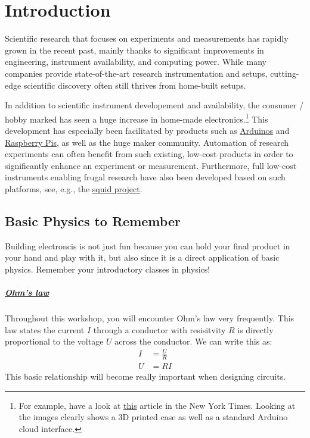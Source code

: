 
\chapter{Introduction}

Scientific research that focuses on experiments and measurements has rapidly grown in the recent past, mainly thanks to significant improvements in engineering, instrument availability, and computing power. While many companies provide state-of-the-art research instrumentation and setups, cutting-edge scientific discovery often still thrives from home-built setups. 

In addition to scientific instrument developement and availability, the consumer / hobby marked has seen a huge increase in home-made electronics.\footnote{For example, have a look at \href{https://www.nytimes.com/2021/10/10/health/coronavirus-ventilation-carbon-dioxide.html}{this} article in the New York Times. Looking at the images clearly shows a 3D printed case as well as a standard Arduino cloud interface.} This development has especially been facilitated by products such as \href{https://www.arduino.cc/}{Arduinos} and \href{https://www.raspberrypi.org/}{Raspberry Pis}, as well as the huge maker community. Automation of research experiments can often benefit from such existing, low-cost products in order to significantly enhance an experiment or measurement. Furthermore, full low-cost instruments enabling frugal research have also been developed based on such platforms, see, e.g., the \href{https://squid-imaging.org/}{\ac{squid} project}.

\section{Basic Physics to Remember}

Building electroncis is not just fun because you can hold your final product in your hand and play with it, but also since it is a direct application of basic physics. Remember your introductory classes in physics! 

\paragraph{\href{https://en.wikipedia.org/wiki/Ohm's_law}{Ohm's law}} Throughout this workshop, you will encounter Ohm's law very frequently. This law states the current $I$ through a conductor with resisitvity $R$ is directly proportional to the voltage $U$ across the conductor. We can write this as:
\begin{align}
    I &= \frac{U}{R}\\
    U &= RI \label{eqn:uri}
\end{align}
This basic relationship will become really important when designing circuits.

